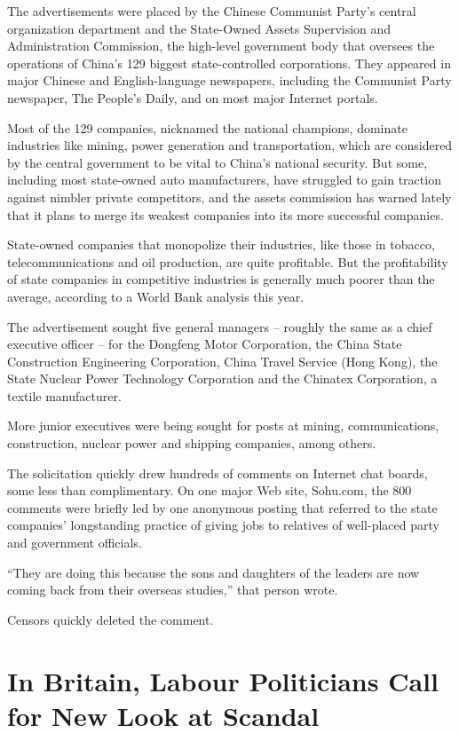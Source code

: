 ﻿\documentclass[12pt]{article}
\begin{document}
The advertisements were placed by the Chinese Communist Party's central organization department and
the State-Owned Assets Supervision and Administration Commission, the high-level government body
that oversees the operations of China's 129 biggest state-controlled corporations. They appeared in
major Chinese and English-language newspapers, including the Communist Party newspaper, The People's
Daily, and on most major Internet portals.

Most of the 129 companies, nicknamed the national champions, dominate industries like mining, power
generation and transportation, which are considered by the central government to be vital to China's
national security. But some, including most state-owned auto manufacturers, have struggled to gain
traction against nimbler private competitors, and the assets commission has warned lately that it
plans to merge its weakest companies into its more successful companies.

State-owned companies that monopolize their industries, like those in tobacco, telecommunications
and oil production, are quite profitable. But the profitability of state companies in competitive
industries is generally much poorer than the average, according to a World Bank analysis this year.

The advertisement sought five general managers -- roughly the same as a chief executive officer --
for the Dongfeng Motor Corporation, the China State Construction Engineering Corporation, China
Travel Service (Hong Kong), the State Nuclear Power Technology Corporation and the Chinatex
Corporation, a textile manufacturer.

More junior executives were being sought for posts at mining, communications, construction, nuclear
power and shipping companies, among others.

The solicitation quickly drew hundreds of comments on Internet chat boards, some less than
complimentary. On one major Web site, Sohu.com, the 800 comments were briefly led by one anonymous
posting that referred to the state companies' longstanding practice of giving jobs to relatives of
well-placed party and government officials.

``They are doing this because the sons and daughters of the leaders are now coming back from their
overseas studies,'' that person wrote.

Censors quickly deleted the comment.

\pagebreak
\section{In Britain, Labour Politicians Call for New Look at Scandal}
\end{document}
